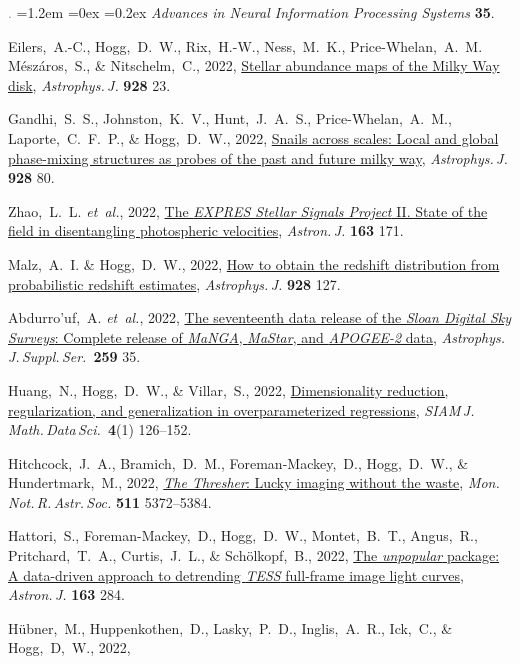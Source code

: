 \documentclass[10pt,letterpaper]{article}
\newcommand{\acronym}[1]{{\small{#1}}}
\newcommand{\foreign}[1]{\textsl{#1}}
\newcommand{\etal}{\foreign{et~al.}}
\newcommand{\project}[1]{\textsl{#1}}
\newcommand{\doi}[2]{\href{http://dx.doi.org/#1}{{#2}}}
\newcommand{\deemph}[1]{\textcolor{grey}{\footnotesize{#1}}}
\newcommand{\pubnumber}[1]{\deemph{{#1}.}}
\newcounter{refpubnum}
\newcommand{\hogglist}{%
    \rightmargin=0in
    \leftmargin=1.2em
    \topsep=0ex
    \partopsep=0pt
    \itemsep=0.2ex
    \parsep=0pt
    \itemindent=-1.0\leftmargin
    \listparindent=0.0\leftmargin
    \settowidth{\labelsep}{~}
    \usecounter{refpubnum}
  }
\begin{document}
\begin{list}{\pubnumber{\therefpubnum}}{\hogglist}
  \textit{Advances in Neural Information Processing Systems} \textbf{35}.
\item
  Eilers,~A.-C., Hogg,~D.~W., Rix,~H.-W., Ness,~M.~K., Price-Whelan,~A.~M. M\'esz\'aros,~S.,
  \& Nitschelm,~C., 2022,
  \doi{10.3847/1538-4357/ac54ad}{Stellar abundance maps of the Milky Way disk},
  \textit{Astrophys.\,J.} \textbf{928} 23.  
\item
  Gandhi,~S.~S., Johnston,~K.~V., Hunt,~J.~A.~S., Price-Whelan,~A.~M., Laporte,~C.~F.~P.,
  \& Hogg,~D.~W., 2022,
  \doi{10.3847/1538-4357/ac47f7}{Snails across scales: Local and global phase-mixing structures as probes of the past and future milky way},
  \textit{Astrophys.\,J.} \textbf{928} 80.
\item
  Zhao,~L.~L. \etal, 2022,
  \doi{10.3847/1538-3881/ac5176}{The \project{EXPRES Stellar Signals Project} II. State of the field in disentangling photospheric velocities},
  \textit{Astron.\,J.} \textbf{163} 171.  
\item
  Malz,~A.~I. \& Hogg,~D.~W., 2022,
  \doi{10.3847/1538-4357/ac062f}{How to obtain the redshift distribution from probabilistic redshift estimates},
  \textit{Astrophys.\,J.} \textbf{928} 127.
\item
  Abdurro'uf,~A. \etal, 2022,
  \doi{10.3847/1538-4365/ac4414}{The seventeenth data release of the \project{Sloan Digital Sky Surveys}: Complete release of \project{MaNGA}, \project{MaStar}, and \project{APOGEE-2} data},
  \textit{Astrophys.\,J.\,Suppl.\,Ser.}\ \textbf{259} 35.
\item
  Huang,~N., Hogg,~D.~W., \& Villar,~S., 2022,
  \doi{10.1137/20M1387821}{Dimensionality reduction, regularization, and generalization in overparameterized regressions},
  \textit{\acronym{SIAM}\,J.\,Math.\,Data\,Sci.}\ \textbf{4}(1) 126--152.
\item
  Hitchcock,~J.~A., Bramich,~D.~M., Foreman-Mackey,~D., Hogg,~D.~W., \& Hundertmark,~M., 2022,
  \doi{10.1093/mnras/stac427}{\project{The Thresher}: Lucky imaging without the waste},
  \textit{Mon.\,Not.\,R.\,Astr.\,Soc.} \textbf{511} 5372--5384. 
\item
  Hattori,~S., Foreman-Mackey,~D., Hogg,~D.~W., Montet,~B.~T., Angus,~R., Pritchard,~T.~A.,
  Curtis,~J.~L., \& Sch\"olkopf,~B., 2022,
  \doi{10.3847/1538-3881/ac625a}{The \project{unpopular} package: A data-driven approach to detrending \project{TESS} full-frame image light curves},
  \textit{Astron.\,J.} \textbf{163} 284.
\item
  H\"ubner,~M., Huppenkothen,~D., Lasky,~P.~D., Inglis,~A.~R., Ick,~C., \& Hogg,~D,~W., 2022,

\end{list}
\end{document}
